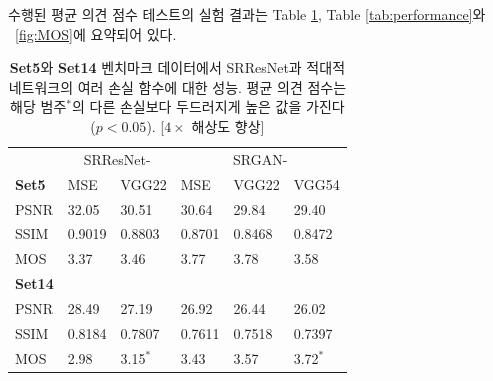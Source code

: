 \documentclass[10pt,twocolumn,letterpaper]{article}
\newcommand{\kor}[1]{#1}
\newcommand{\eng}[1]{}
\begin{document}
\eng{
The experimental results of the conducted \ac{MOS} tests are summarized in Table \ref{tab:perceptual}, Table \ref{tab:performance} and \figurename~\ref{fig:MOS}.
}\kor{
수행된 \ac{평균 의견 점수} 테스트의 실험 결과는 Table \ref{tab:perceptual}, Table \ref{tab:performance}와 \figurename~\ref{fig:MOS}에 요약되어 있다.
}

\begin{table}[]
\centering
\caption{\eng{Performance of different loss functions for SRResNet and the adversarial networks on Set5 and Set14 benchmark data. MOS score significantly higher ($p<0.05$) than with other losses in that category$^*$. [$4\times$ upscaling]}\kor{
\textbf{Set5}와 \textbf{Set14} 벤치마크 데이터에서 SRResNet과 적대적 네트워크의 여러 손실 함수에 대한 성능. 평균 의견 점수는
해당 범주$^*$의 다른 손실보다 두드러지게 높은 값을 가진다 ($p<0.05$). [$4\times$ 해상도 향상]
}}
\label{tab:perceptual}
\begin{adjustbox}{max width=0.48\textwidth}
\begin{tabular}{lll | lll}
& \multicolumn{2}{c}{SRResNet-} & \multicolumn{3}{c}{SRGAN-} \\
\textbf{Set5} & MSE & VGG22 & MSE & VGG22 & VGG54 \\
\hline

PSNR &  32.05 & 30.51 & 30.64 & 29.84 & 29.40 \\
SSIM & 0.9019 & 0.8803 & 0.8701 & 0.8468 & 0.8472 \\
MOS  &  3.37 & 3.46 & 3.77 & 3.78 & 3.58 \\ [0.3cm]
\textbf{Set14} & & &  \\
\hline
PSNR &  28.49 & 27.19 & 26.92 & 26.44 & 26.02 \\
SSIM &  0.8184 & 0.7807 & 0.7611 & 0.7518 & 0.7397 \\
MOS  &  2.98 & 3.15$^*$ & 3.43 & 3.57 & 3.72$^*$  \\
\end{tabular}
\end{adjustbox}
\end{table}
\end{document}

